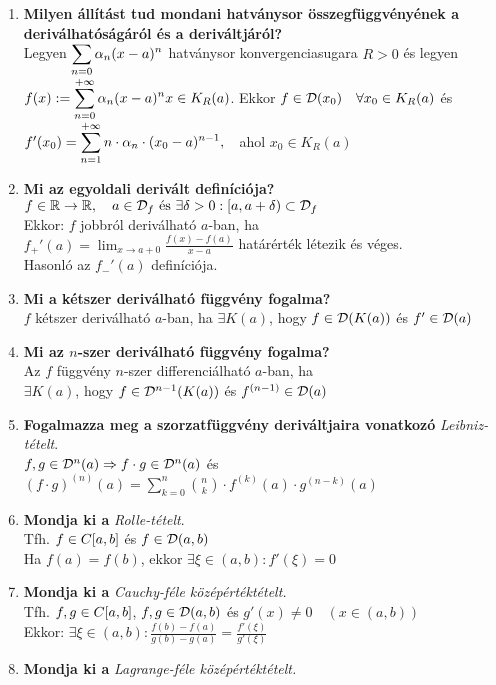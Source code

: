\documentclass[a4paper,11pt]{article}
\begin{document}
\begin{enumerate}
	\item \textbf{Milyen állítást tud mondani hatványsor összegfüggvényének a deriválhatóságáról és a deriváltjáról?}\\[0.1cm]Legyen $\displaystyle\sum_{n=0}\alpha_n(x-a)^n$ hatványsor konvergenciasugara $R>0$ és legyen $f(x):=\displaystyle\sum_{n=0}^{+\infty}\alpha_n(x-a)^n\quad\\x\in K_R(a)$. Ekkor $f\in\mathcal{D}(x_0)\quad\forall x_0\in K_R(a)$ és $f'(x_0)=\displaystyle\sum_{n=1}^{+\infty} n\cdot\alpha_n\cdot(x_0-a)^{n-1},\quad$ahol $x_0\in K_R(a)$
	\item \textbf{Mi az egyoldali derivált definíciója?}\\[0.1cm]$f\in\displaystyle\mathbb{R}\to\mathbb{R}, \quad a\in\mathcal{D}_f\text{  és  }\exists\delta>0:[a,a+\delta) \subset\mathcal{D}_f$ \\[0.2cm]Ekkor: $f$ jobbról deriválható $a$-ban, ha\\[0.2cm] $f_+'(a)=\displaystyle\lim_{x\to a+0}\frac{f(x)-f(a)}{x-a}$ határérték létezik és véges.\\[0.2cm]Hasonló az $f_-'(a)$ definíciója.
	\item \textbf{Mi a kétszer deriválható függvény fogalma?}\\[0.1cm]$f$ kétszer deriválható $a$-ban, ha $\exists K(a)$, hogy $f\in\mathcal{D}(K(a))$ és $f'\in\mathcal{D}(a)$
	\item \textbf{Mi az $n$-szer deriválható függvény fogalma?}\\[0.1cm]Az $f$ függvény $n$-szer differenciálható $a$-ban, ha \\[0.2cm] $\exists K(a)$, hogy $f\in\mathcal{D}^{n-1}(K(a))$ és $f^{(n-1)}\in\mathcal{D}(a)$
	\item \textbf{Fogalmazza meg a szorzatfüggvény deriváltjaira vonatkozó} \textit{Leibniz-tételt}.\\[0.2cm]$f,g\in\mathcal{D}^n(a)\Rightarrow f\cdot g\in\mathcal{D}^n(a)$ és $(f\cdot g)^{(n)}(a)=\displaystyle\sum_{k=0}^{n}\binom{n}{k}\cdot f^{(k)} (a)\cdot g^{(n-k)}(a)$
	\item \textbf{Mondja ki a} \textit{Rolle-tételt}.\\[0.1cm]Tfh. $f\in C[a,b]$ és $f\in\mathcal{D}(a,b)$\\[0.2cm]Ha $f(a)=f(b)$, ekkor $\exists\xi\in(a,b):f'(\xi)=0$
	\item \textbf{Mondja ki a} \textit{Cauchy-féle középértéktételt.}\\[0.1cm]
	Tfh. $f,g\in C[a,b]$, $f,g\in\mathcal{D}(a,b)$ és $g'(x)\neq0\quad(x\in(a,b))$\\[0.2cm]Ekkor: $\exists\xi\in(a,b): \frac{f(b)-f(a)}{g(b)-g(a)}=\frac{f'(\xi)}{g'(\xi)}$
	\item \textbf{Mondja ki a} \textit{Lagrange-féle középértéktételt.}\\[0.1cm]

\end{enumerate}
\end{document}
